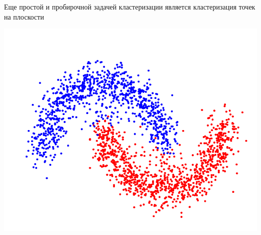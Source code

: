 Еще простой и пробирочной задачей кластеризации является кластеризация точек на плоскости
\begin{center}
    \includegraphics[scale=0.5]{tickets/pictures/make_moons.png}
\end{center}